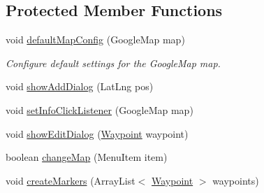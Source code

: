 \subsection*{Protected Member Functions}
\begin{DoxyCompactItemize}
\item 
void \hyperlink{classuk_1_1ac_1_1swan_1_1digitaltrails_1_1fragments_1_1_map_fragment_ad7ad0119b7dd10580e3053fdf21b64f2}{default\+Map\+Config} (Google\+Map map)
\begin{DoxyCompactList}\small\item\em Configure default settings for the Google\+Map map. \end{DoxyCompactList}\item 
void \hyperlink{classuk_1_1ac_1_1swan_1_1digitaltrails_1_1fragments_1_1_map_fragment_af458f2c1b3e5c9cc817ac1403e04de41}{show\+Add\+Dialog} (Lat\+Lng pos)
\item 
void \hyperlink{classuk_1_1ac_1_1swan_1_1digitaltrails_1_1fragments_1_1_map_fragment_a48c1510176cd4f173b5750d9dec68f52}{set\+Info\+Click\+Listener} (Google\+Map map)
\item 
void \hyperlink{classuk_1_1ac_1_1swan_1_1digitaltrails_1_1fragments_1_1_map_fragment_a0761db3d0d32cbd7287471e909fb5a80}{show\+Edit\+Dialog} (\hyperlink{classuk_1_1ac_1_1swan_1_1digitaltrails_1_1components_1_1_waypoint}{Waypoint} waypoint)
\item 
boolean \hyperlink{classuk_1_1ac_1_1swan_1_1digitaltrails_1_1fragments_1_1_map_fragment_a0be39a91507123ee918a60e992b27951}{change\+Map} (Menu\+Item item)
\item 
void \hyperlink{classuk_1_1ac_1_1swan_1_1digitaltrails_1_1fragments_1_1_map_fragment_a496a4efd2fbbf4e941a02f74b932b23c}{create\+Markers} (Array\+List$<$ \hyperlink{classuk_1_1ac_1_1swan_1_1digitaltrails_1_1components_1_1_waypoint}{Waypoint} $>$ waypoints)
\end{DoxyCompactItemize}
